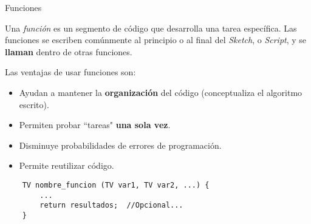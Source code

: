 \begin{frame}[fragile]{Funciones}\vspace{10pt}

Una \textit{funci\'on} es un segmento de c\'odigo que desarrolla una tarea espec\'ifica. Las funciones se escriben com\'unmente al principio o al final del \textit{Sketch}, o \textit{Script}, y se \textbf{llaman} dentro de otras funciones.

\vspace{5pt}

Las ventajas de usar funciones son:

\begin{itemize}
	\item Ayudan a mantener la \textbf{organizaci\'on} del c\'odigo (conceptualiza el algoritmo escrito).
	\item Permiten probar ``tareas" \textbf{una sola vez}.
	\item Disminuye probabilidades de errores de programaci\'on.
	\item Permite reutilizar c\'odigo.
\end{itemize}

\begin{center}
\begin{lstlisting}
	TV nombre_funcion (TV var1, TV var2, ...) {
		...
		return resultados;	//Opcional...	
	}
\end{lstlisting}
\end{center}

\end{frame}